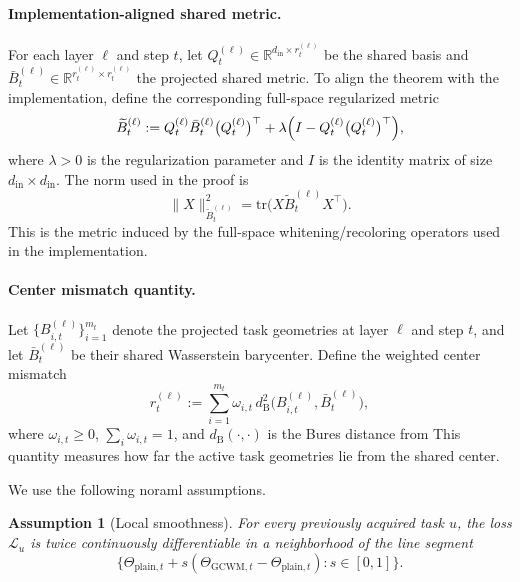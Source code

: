 \documentclass{article}
\newtheorem{assumption}{Assumption}
\begin{document}
\paragraph{Implementation-aligned shared metric.}
For each layer \(\ell\) and step \(t\), let \(Q_t^{(\ell)}\in\mathbb{R}^{d_{\mathrm{in}}\times r_t^{(\ell)}}\) be the shared basis and \(\bar B_t^{(\ell)}\in\mathbb{R}^{r_t^{(\ell)}\times r_t^{(\ell)}}\) the projected shared metric. To align the theorem with the implementation, define the corresponding full-space regularized metric
\begin{equation}
\widetilde B_t^{(\ell)}
:=
Q_t^{(\ell)} \bar B_t^{(\ell)} \bigl(Q_t^{(\ell)}\bigr)^\top
+
\lambda \Bigl(I - Q_t^{(\ell)}\bigl(Q_t^{(\ell)}\bigr)^\top\Bigr),
\label{eq:full_space_metric_appendix}
\end{equation}
where \(\lambda>0\) is the regularization parameter and \(I\) is the identity matrix of size \(d_{\mathrm{in}}\times d_{\mathrm{in}}\). The norm used in the proof is
\[
\|X\|_{\widetilde B_t^{(\ell)}}^2
=
\mathrm{tr}\!\bigl(X \widetilde B_t^{(\ell)} X^\top\bigr).
\]
This is the metric induced by the full-space whitening/recoloring operators used in the implementation.





\paragraph{Center mismatch quantity.}
Let \(\{B_{i,t}^{(\ell)}\}_{i=1}^{m_t}\) denote the projected task geometries at layer \(\ell\) and step \(t\), and let \(\bar B_t^{(\ell)}\) be their shared Wasserstein barycenter. Define the weighted center mismatch
\begin{equation}
r_t^{(\ell)}
:=
\sum_{i=1}^{m_t}\omega_{i,t}\,
d_{\mathrm B}^2\!\bigl(B_{i,t}^{(\ell)},\bar B_t^{(\ell)}\bigr),
\label{eq:center_mismatch_appendix_final}
\end{equation}
where \(\omega_{i,t}\ge 0\), \(\sum_i \omega_{i,t}=1\), and \(d_{\mathrm B}(\cdot,\cdot)\) is the Bures distance from \cite{bhatia2019bures} This quantity measures how far the active task geometries lie from the shared center.

We use the following noraml assumptions.

\begin{assumption}[Local smoothness]
\label{ass:local_smoothness_appendix_final}
For every previously acquired task \(u\), the loss \(\mathcal L_u\) is twice continuously differentiable in a neighborhood of the line segment
\[
\bigl\{
\Theta_{\mathrm{plain},t}+s(\Theta_{\mathrm{GCWM},t}-\Theta_{\mathrm{plain},t})
: s\in[0,1]
\bigr\}.
\]
\end{assumption}
\end{document}
